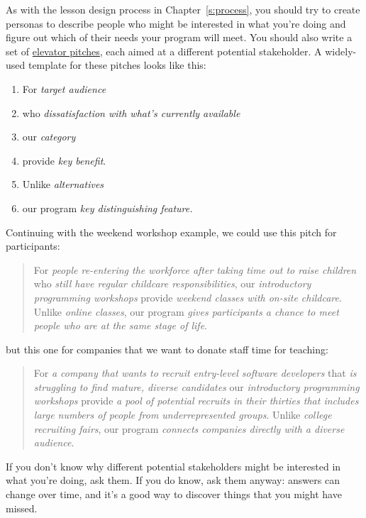 As with the lesson design process in Chapter~\ref{s:process}, you should
try to create personas to describe people who might be interested in
what you're doing and figure out which of their needs your program
will meet. You should also write a set of \protect\hyperlink{g:elevator-pitch}{elevator
pitches}, each aimed at a different potential
stakeholder. A widely-used template for these pitches looks like this:

\begin{enumerate}
\item
  For \emph{target audience}
\item
  who \emph{dissatisfaction with what's currently available}
\item
  our \emph{category}
\item
  provide \emph{key benefit}.
\item
  Unlike \emph{alternatives}
\item
  our program \emph{key distinguishing feature.}
\end{enumerate}

Continuing with the weekend workshop example, we could use this pitch
for participants:

\begin{quote}\setlength{\parindent}{0pt}
For \emph{people re-entering the workforce after taking time out to raise
children} who \emph{still have regular childcare responsibilities}, our
\emph{introductory programming workshops} provide \emph{weekend classes with
on-site childcare}. Unlike \emph{online classes}, our program \emph{gives
participants a chance to meet people who are at the same stage of
life}.
\end{quote}

but this one for companies that we want to donate staff time for
teaching:

\begin{quote}\setlength{\parindent}{0pt}
For \emph{a company that wants to recruit entry-level software developers}
that \emph{is struggling to find mature, diverse candidates} our
\emph{introductory programming workshops} provide \emph{a pool of potential
recruits in their thirties that includes large numbers of people from
underrepresented groups}. Unlike \emph{college recruiting fairs}, our
program \emph{connects companies directly with a diverse audience}.
\end{quote}

If you don't know why different potential stakeholders might be
interested in what you're doing, ask them. If you do know, ask them
anyway: answers can change over time, and it's a good way to discover
things that you might have missed.

